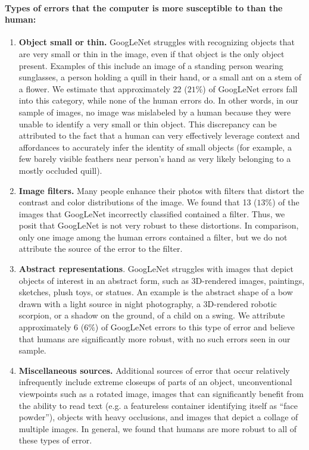 \paragraph{Types of errors that the computer is more susceptible to than the human:}

\begin{enumerate}
\item \textbf{Object small or thin.} GoogLeNet struggles with recognizing objects that are very small or thin in the image, even if that object is the only object present. Examples of this include an image of a standing person wearing sunglasses, a person holding a quill in their hand, or a small ant on a stem of a flower. We estimate that approximately 22 ($21\%$) of GoogLeNet errors fall into this category, while none of the human errors do. In other words, in our sample of images, no image was mislabeled by a human because they were unable to identify a very small or thin object. This discrepancy can be attributed to the fact that a human can very effectively leverage context and affordances to accurately infer the identity of small objects (for example, a few barely visible feathers near person's hand as very likely belonging to a mostly occluded quill).

\item \textbf{Image filters.} Many people enhance their photos with filters that distort the contrast and color distributions of the image. We found that 13 ($13\%$) of the images that GoogLeNet incorrectly classified contained a filter. Thus, we posit that GoogLeNet is not very robust to these distortions. In comparison, only one image among the human errors contained a filter, but we do not attribute the source of the error to the filter.

\item \textbf{Abstract representations}. GoogLeNet struggles with images that depict objects of interest in an abstract form, such as 3D-rendered images, paintings, sketches, plush toys, or statues. An example is the abstract shape of a bow drawn with a light source in night photography, a 3D-rendered robotic scorpion, or a shadow on the ground, of a child on a swing. We attribute approximately 6 ($6\%$) of GoogLeNet errors to this type of error and believe that humans are significantly more robust, with no such errors seen in our sample.

\item \textbf{Miscellaneous sources.} Additional sources of error that occur relatively infrequently include extreme closeups of parts of an object, unconventional viewpoints such as a rotated image, images that can significantly benefit from the ability to read text (e.g. a featureless container identifying itself as ``face powder''), objects with heavy occlusions, and images that depict a collage of multiple images. In general, we found that humans are more robust to all of these types of error.
\end{enumerate}

